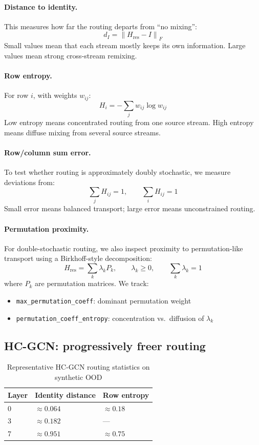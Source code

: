 \documentclass[11pt,a4paper]{article}
\begin{document}
\paragraph{Distance to identity.}
This measures how far the routing departs from ``no mixing'':
\[
d_I = \left\| H_{\mathrm{res}} - I \right\|_F
\]
Small values mean that each stream mostly keeps its own information.
Large values mean strong cross-stream remixing.

\paragraph{Row entropy.}
For row $i$, with weights $w_{ij}$:
\[
H_i = -\sum_j w_{ij}\log w_{ij}
\]
Low entropy means concentrated routing from one source stream.
High entropy means diffuse mixing from several source streams.

\paragraph{Row/column sum error.}
To test whether routing is approximately doubly stochastic, we measure
deviations from:
\[
\sum_j H_{ij} = 1,
\qquad
\sum_i H_{ij} = 1
\]
Small error means balanced transport; large error means unconstrained routing.

\paragraph{Permutation proximity.}
For double-stochastic routing, we also inspect proximity to permutation-like transport
using a Birkhoff-style decomposition:
\[
H_{\mathrm{res}} = \sum_k \lambda_k P_k,
\qquad
\lambda_k \ge 0,
\qquad
\sum_k \lambda_k = 1
\]
where $P_k$ are permutation matrices.
We track:
\begin{itemize}[noitemsep]
  \item \texttt{max\_permutation\_coeff}: dominant permutation weight
  \item \texttt{permutation\_coeff\_entropy}: concentration vs.\ diffusion of $\lambda_k$
\end{itemize}

\subsection{HC-GCN: progressively freer routing}

\begin{table}[h]
\centering
\caption{Representative HC-GCN routing statistics on synthetic OOD}
\begin{tabular}{C{1.5cm} R{3cm} R{3cm}}
\toprule
Layer & Identity distance & Row entropy \\
 & $\approx 0.064$ & $\approx 0.18$ \\
3 & $\approx 0.182$ & --- \\
7 & $\approx 0.951$ & $\approx 0.75$ \\
\bottomrule
\end{tabular}
\end{table}
\end{document}
